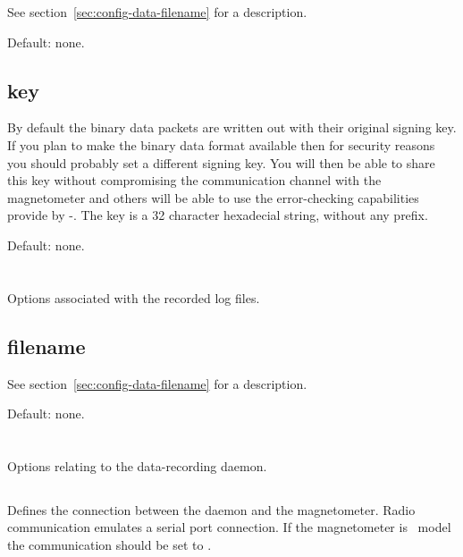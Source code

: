See section~\ref{sec:config-data-filename} for a description.

Default: none.


\subsection{key}
By default the binary data packets are written out with their original
signing key. If you plan to make the binary data format available then
for security reasons you should probably set a different signing
key. You will then be able to share this key without compromising the
communication channel with the magnetometer and others will be able to
use the error-checking capabilities provide by \hmac-\mdfive. The key
is a 32 character hexadecial string, without any  prefix.

Default: none.


\section{\code{[logfile]}}
Options associated with the recorded log files. 

\subsection{filename}

See section~\ref{sec:config-data-filename} for a description.

Default: none.



\section{\code[daemon]}
Options relating to the data-recording daemon.

\subsection{}
Defines the connection between the daemon and the magnetometer. Radio
communication emulates a serial port connection. If the magnetometer
is \PoE\ model the communication should be set to .

